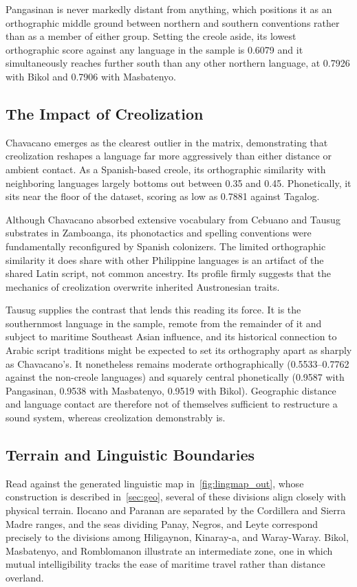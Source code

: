 Pangasinan is never markedly distant from anything, which positions it as an
orthographic middle ground between northern and southern conventions rather
than as a member of either group. Setting the creole aside, its lowest
orthographic score against any language in the sample is 0.6079 and it
simultaneously reaches further south than any other northern language, at
0.7926 with Bikol and 0.7906 with Masbatenyo.

\subsection{The Impact of Creolization}

Chavacano emerges as the clearest outlier in the matrix, demonstrating that
creolization reshapes a language far more aggressively than either distance or
ambient contact. As a Spanish-based creole, its orthographic similarity with
neighboring languages largely bottoms out between 0.35 and 0.45. Phonetically,
it sits near the floor of the dataset, scoring as low as 0.7881 against
Tagalog.

Although Chavacano absorbed extensive vocabulary from Cebuano and Tausug
substrates in Zamboanga, its phonotactics and spelling conventions were
fundamentally reconfigured by Spanish colonizers. The limited orthographic
similarity it does share with other Philippine languages is an artifact of the
shared Latin script, not common ancestry. Its profile firmly suggests that the
mechanics of creolization overwrite inherited Austronesian traits.

Tausug supplies the contrast that lends this reading its force. It is the
southernmost language in the sample, remote from the remainder of it and
subject to maritime Southeast Asian influence, and its historical connection to
Arabic script traditions might be expected to set its orthography apart as
sharply as Chavacano's. It nonetheless remains moderate orthographically
(0.5533--0.7762 against the non-creole languages) and squarely central
phonetically (0.9587 with Pangasinan, 0.9538 with Masbatenyo, 0.9519 with
Bikol). Geographic distance and language contact are therefore not of
themselves sufficient to restructure a sound system, whereas creolization
demonstrably is.

\subsection{Terrain and Linguistic Boundaries}

Read against the generated linguistic map in~\cref{fig:lingmap_out}, whose
construction is described in~\cref{sec:geo}, several of these divisions align
closely with physical terrain. Ilocano and Paranan are separated by the
Cordillera and Sierra Madre ranges, and the seas dividing Panay, Negros, and
Leyte correspond precisely to the divisions among Hiligaynon, Kinaray-a, and
Waray-Waray. Bikol, Masbatenyo, and Romblomanon illustrate an intermediate
zone, one in which mutual intelligibility tracks the ease of maritime travel
rather than distance overland.

